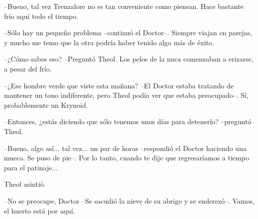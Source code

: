 --Bueno, tal vez Trenzalore no es tan conveniente como piensan. Hace bastante frío aquí todo el tiempo.



--Sólo hay un pequeño problema --continuó el Doctor--. Siempre viajan en parejas, y mucho me temo que la otra podría haber tenido algo más de éxito.



--¿Cómo sabes eso? --Preguntó Theol. Los pelos de la nuca comenzaban a erizarse, a pesar del frío.



--¿Ese hombre verde que viste esta mañana? --El Doctor estaba tratando de mantener un tono indiferente, pero Theol podía ver que estaba preocupado--. Sí, probablemente un Krynoid.



--Entonces, ¿estás diciendo que sólo tenemos unos días para detenerlo? --preguntó Theol.



--Bueno, algo así... tal vez... un par de horas --respondió el Doctor haciendo una mueca. Se puso de pie--. Por lo tanto, cuando te dije que regresaríamos a tiempo para el patinaje...



Theol asintió.

 --No se preocupe, Doctor --Se sacudió la nieve de su abrigo y se enderezó--. Vamos, el huerto está por aquí.